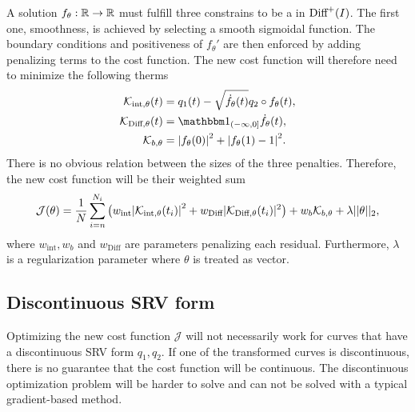 A solution \(f_\theta : \mathbb{R} \rightarrow \mathbb{R} \) must fulfill three constrains to be a in \(\text{Diff}^+(I) \). The first one, smoothness, is achieved by selecting a smooth sigmoidal function. The boundary conditions and positiveness of \(f_\theta'\) are then enforced by adding penalizing terms to the cost function. The new cost function will therefore need to minimize the following therms
\begin{align*}
  \mathcal{K}_{\text{int},\theta}(t)  & = q_1(t) - \sqrt{\dot f_\theta(t)}q_2 \circ f_\theta(t), \\
  \mathcal{K}_{\text{Diff},\theta}(t) & = \one_{(-\infty,0]}\dot f_{\theta}(t),                  \\
  \mathcal{K}_{b,\theta}              & = \abs{f_\theta(0)}^2 + \abs{f_\theta(1) - 1}^2.
\end{align*}
There is no obvious relation between the sizes of the three penalties. Therefore, the new cost function will be their weighted sum
\begin{equation}\label{eq:neural_cost}
  \mathcal{J}(\theta) =
  \frac{1}{N}\sum_{i=n}^{N_i}{
  \big(
  w_\text{int}\abs{\mathcal{K}_{\text{int},\theta}(t_i)}^2 +
  w_{\text{Diff}}|{\mathcal{K}}_{\text{Diff}, \theta}(t_i)|^2
  \big)} +
  w_{b}{\mathcal{K}}_{b,\theta} +
  \lambda||\theta||_2,
\end{equation}
where  \(w_\text{int}, w_{b} \) and  \(w_{\text{Diff}}\) are parameters penalizing each residual. Furthermore, \(\lambda\) is a regularization parameter where \(\theta\) is treated as vector.

\subsection{Discontinuous SRV form}\label{subsec:discont_curves}
Optimizing the new cost function \(\mathcal{J}\) will not necessarily work for curves that have a discontinuous SRV form \(q_1, q_2\). If one of the transformed curves is discontinuous, there is no guarantee that the cost function will be continuous. The discontinuous optimization problem will be harder to solve and can not be solved with a typical gradient-based method.

